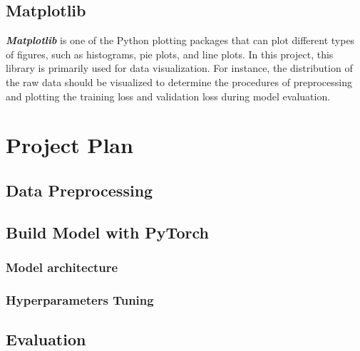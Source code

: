 \documentclass[12pt,twoside]{report}
\begin{document}
\section{Matplotlib}
\textbf{\textit{Matplotlib}} is one of the Python plotting packages that can plot different types of figures, such as histograms, pie plots, and line plots. In this project, this library is primarily used for data visualization. For instance, the distribution of the raw data should be visualized to determine the procedures of preprocessing and plotting the training loss and validation loss during model evaluation. 



\chapter{Project Plan}

\section{Data Preprocessing}

\section{Build Model with PyTorch}
\subsection{Model architecture}
\subsection{Hyperparameters Tuning}

\section{Evaluation}








\end{document}
